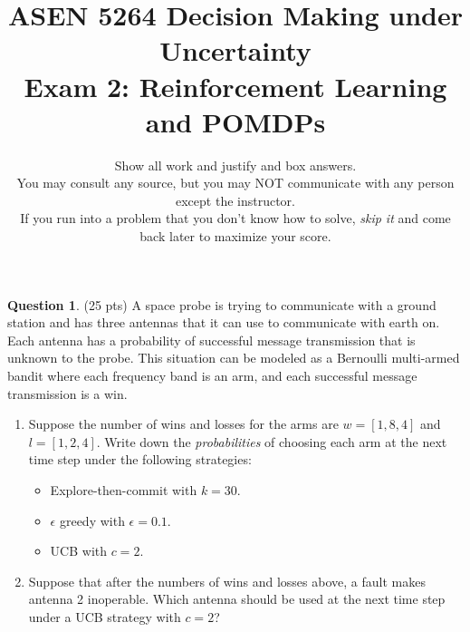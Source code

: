 \documentclass{article}
\title{ASEN 5264 Decision Making under Uncertainty\\
       Exam 2: Reinforcement Learning and POMDPs}
\date{\small Show all work and justify and box answers.\\
You may consult any source, but you may NOT communicate with any person except the instructor.\\
If you run into a problem that you don't know how to solve, \emph{skip it} and come back later to maximize your score.
}
\theoremstyle{definition}
\newtheorem{question}[thm]{Question}
\begin{document}
\maketitle


\begin{question} (25 pts)
    A space probe is trying to communicate with a ground station and has three antennas that it can use to communicate with earth on. Each antenna has a probability of successful message transmission that is unknown to the probe. This situation can be modeled as a Bernoulli multi-armed bandit where each frequency band is an arm, and each successful message transmission is a win.
    \begin{enumerate}[label=\alph*)]
        \item Suppose the number of wins and losses for the arms are $w = [1, 8, 4]$ and $l = [1, 2, 4]$. Write down the \emph{probabilities} of choosing each arm at the next time step under the following strategies:
            \begin{itemize}
                \item Explore-then-commit with $k = 30$.
                \item $\epsilon$ greedy with $\epsilon = 0.1$.
                \item UCB with $c=2$.
            \end{itemize}
        \item Suppose that after the numbers of wins and losses above, a fault makes antenna 2 inoperable. Which antenna should be used at the next time step under a UCB strategy with $c=2$?
    \end{enumerate}
\end{question}
\end{document}
